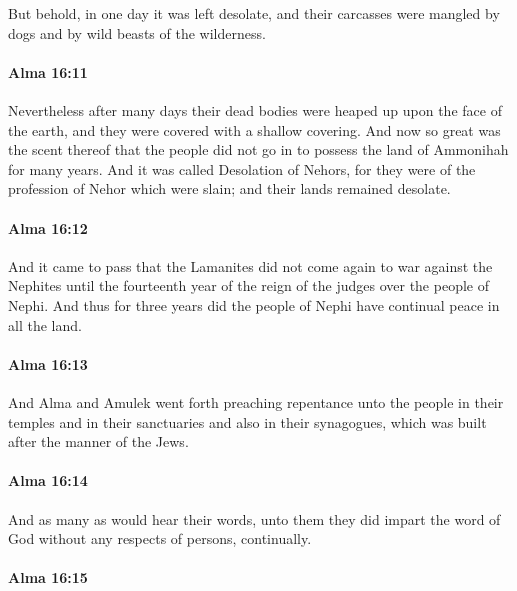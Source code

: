 			But behold, in one day it was left desolate,
			and their carcasses were mangled by dogs and by wild beasts of the wilderness.

		\paragraph{Alma 16:11} %
			\label{ALMA-16-11}

			Nevertheless after many days
			their dead bodies were heaped up upon the face of the earth,
			and they were covered with a shallow covering.
			And now so great was the scent thereof
			that the people did not go in to possess the land of Ammonihah for many years.
			And it was called Desolation of Nehors,
			for they were of the profession of Nehor which were slain;
			and their lands remained desolate.

		\paragraph{Alma 16:12} %
			\label{ALMA-16-12}

			And it came to pass that
			the Lamanites did not come again to war against the Nephites
			until the fourteenth year of the reign of the judges over the people of Nephi.
			And thus for three years did the people of Nephi
			have continual peace in all the land.

		\paragraph{Alma 16:13} %
			\label{ALMA-16-13}

			And Alma and Amulek went forth preaching repentance unto the people
			in their temples and in their sanctuaries and also in their synagogues,
			which was built after the manner of the Jews.

		\paragraph{Alma 16:14} %
			\label{ALMA-16-14}

			And as many as would hear their words,
			unto them they did impart the word of God
			without any respects of persons, continually.

		\paragraph{Alma 16:15} %
			\label{ALMA-16-15}

